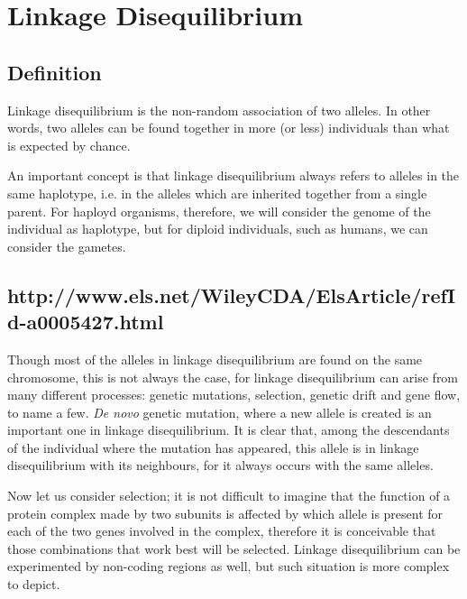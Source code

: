 \documentclass[../main.tex]{subfiles}
\begin{document}
\chapter{Linkage Disequilibrium}

\section{Definition}

Linkage disequilibrium is the non-random association of two alleles. In
other words, two alleles can be found together in more (or less)
individuals than what is expected by chance.

An important concept is that linkage disequilibrium always refers to
alleles in the same haplotype, i.e. in the alleles which are inherited
together from a single parent. For haployd organisms, therefore,
we will consider the genome of the individual as haplotype, but for
diploid individuals, such as humans, we can consider the gametes.

\section{http://www.els.net/WileyCDA/ElsArticle/refId-a0005427.html}

Though most of the alleles in linkage disequilibrium are found on the 
same chromosome, this is not always the case, for linkage disequilibrium 
can arise from many different processes: genetic mutations, selection, 
genetic drift and gene flow, to name a few. \textit{De novo} genetic 
mutation, where a new allele is created is an important one in linkage 
disequilibrium. It is clear that, among the descendants of the 
individual where the mutation has appeared, this allele is in linkage 
disequilibrium with its neighbours, for it always occurs with the same 
alleles.

Now let us consider selection; it is not difficult to imagine that the 
function of a protein complex made by two subunits is affected by which 
allele is present for each of the two genes involved in the complex, 
therefore it is conceivable that those combinations that work best will 
be selected. Linkage disequilibrium can be experimented by non-coding 
regions as well, but such situation is more complex to depict.
\end{document}
